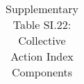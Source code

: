\begin{longtable}{llcccccccccc}
\caption{Supplementary Table SI.22: Collective Action Index Components} \label{tab:pap__c2_4} \\                                                                                                                                                                                                                                                                                                                                                                                                                                                                                                                                                                                                                                                                                                                                                                                          
\hline \hline                                                                                                                                                                                                                                                                                                                                                                                                                                                                                                                                                                                                                                                                                                                                                                                                                                                                             

\end{longtable}
